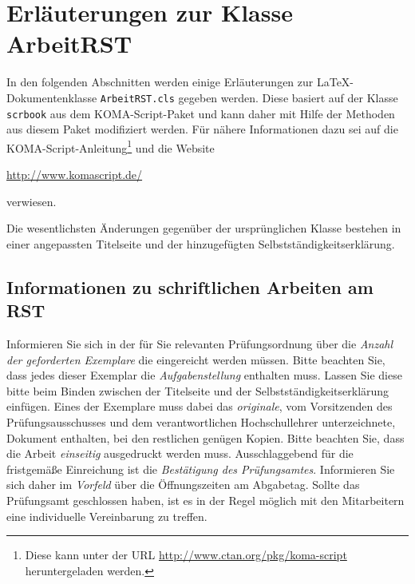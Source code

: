 \chapter{Erläuterungen zur Klasse ArbeitRST}
In den folgenden Abschnitten werden einige Erläuterungen zur \LaTeX-Dokumentenklasse \texttt{ArbeitRST.cls} gegeben werden. Diese basiert auf der Klasse \texttt{scrbook} aus dem KOMA-Script-Paket und kann daher mit Hilfe der Methoden aus diesem Paket modifiziert werden. Für nähere Informationen dazu sei auf die KOMA-Script-Anleitung\footnote{Diese kann unter der URL \url{http://www.ctan.org/pkg/koma-script} heruntergeladen werden.} und die Website
\begin{center}
	\url{http://www.komascript.de/}
\end{center}
verwiesen. 

Die wesentlichsten Änderungen gegenüber der ursprünglichen Klasse bestehen in einer angepassten Titelseite und der hinzugefügten Selbstständigkeitserklärung.



\section{Informationen zu schriftlichen Arbeiten am RST}
Informieren Sie sich in der für Sie relevanten Prüfungsordnung über die \emph{Anzahl der geforderten Exemplare} die eingereicht werden müssen. Bitte beachten Sie, dass jedes dieser Exemplar die \emph{Aufgabenstellung} enthalten muss. Lassen Sie diese bitte beim Binden zwischen der Titelseite und der Selbstständigkeitserklärung einfügen. Eines der Exemplare muss dabei das \emph{originale}, vom Vorsitzenden des Prüfungsausschusses und dem verantwortlichen Hochschullehrer unterzeichnete, Dokument enthalten, bei den restlichen genügen Kopien. Bitte beachten Sie, dass die Arbeit \emph{einseitig} ausgedruckt werden muss. Ausschlaggebend für die fristgemäße Einreichung ist die \emph{Bestätigung des Prüfungsamtes}. Informieren Sie sich daher im \emph{Vorfeld} über die Öffnungszeiten am Abgabetag. Sollte das Prüfungsamt geschlossen haben, ist es in der Regel möglich mit den Mitarbeitern eine individuelle Vereinbarung zu treffen.



